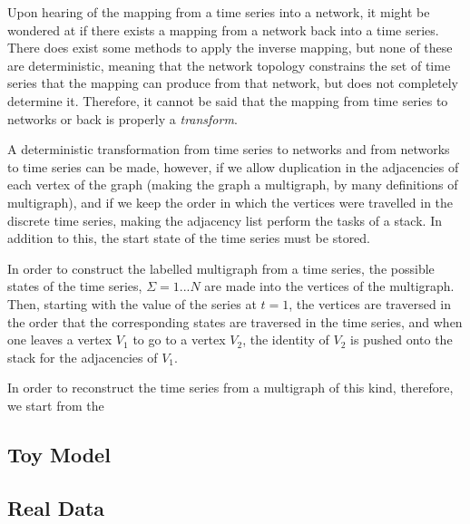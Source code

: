 \documentclass[12pt]{article}
\begin{document}
Upon hearing of the mapping from a time series into a network, it might be wondered at if there exists a mapping from a network back into a time series. There does exist some methods to apply the inverse mapping, but none of these are deterministic, meaning that the network topology constrains the set of time series that the mapping can produce from that network, but does not completely determine it. Therefore, it cannot be said that the mapping from time series to networks or back is properly a \emph{transform}.%

A deterministic transformation from time series to networks and from networks to time series can be made, however, if we allow duplication in the adjacencies of each vertex of the graph (making the graph a multigraph, by many definitions of multigraph), and if we keep the order in which the vertices were travelled in the discrete time series, making the adjacency list perform the tasks of a stack. In addition to this, the start state of the time series must be stored.

In order to construct the labelled multigraph from a time series, the possible states of the time series, $\Sigma = {1 ... N}$ are made into the vertices of the multigraph. Then, starting with the value of the series at $t =1$, the vertices are traversed in the order that the corresponding states are traversed in the time series, and when one leaves a vertex $V_1$ to go to a vertex $V_2$, the identity of $V_2$ is pushed onto the stack for the adjacencies of $V_1$.

In order to reconstruct the time series from a multigraph of this kind, therefore, we start from the %


\subsection{Toy Model}


%

\subsection{Real Data}


\begin{thebibliography}{}
\end{thebibliography}
\end{document}
